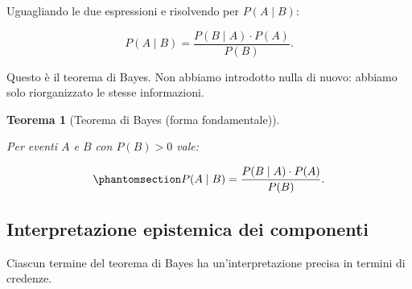 \documentclass[
  italian,
  letterpaper,
  a4paper,
  11pt,
  open=any]{scrbook}
\theoremstyle{plain}
\newtheorem{theorem}{Teorema}[chapter]
\theoremstyle{definition}
\theoremstyle{definition}
\theoremstyle{remark}
\begin{document}
Uguagliando le due espressioni e risolvendo per \(P(A \mid B)\):

\[
P(A \mid B) = \frac{P(B \mid A) \cdot P(A)}{P(B)}.
\]

Questo è il teorema di Bayes. Non abbiamo introdotto nulla di nuovo:
abbiamo solo riorganizzato le stesse informazioni.

\begin{theorem}[Teorema di Bayes (forma
fondamentale)]\protect\hypertarget{thm-bayes-theorem}{}\label{thm-bayes-theorem}

Per eventi \(A\) e \(B\) con \(P(B) > 0\) vale:

\begin{equation}\protect\phantomsection\label{eq-bayes-basic}{
P(A \mid B) = \frac{P(B \mid A) \cdot P(A)}{P(B)}.
}\end{equation}

\end{theorem}

\subsection{Interpretazione epistemica dei
componenti}\label{interpretazione-epistemica-dei-componenti}

Ciascun termine del teorema di Bayes ha un'interpretazione precisa in
termini di credenze.
\end{document}
